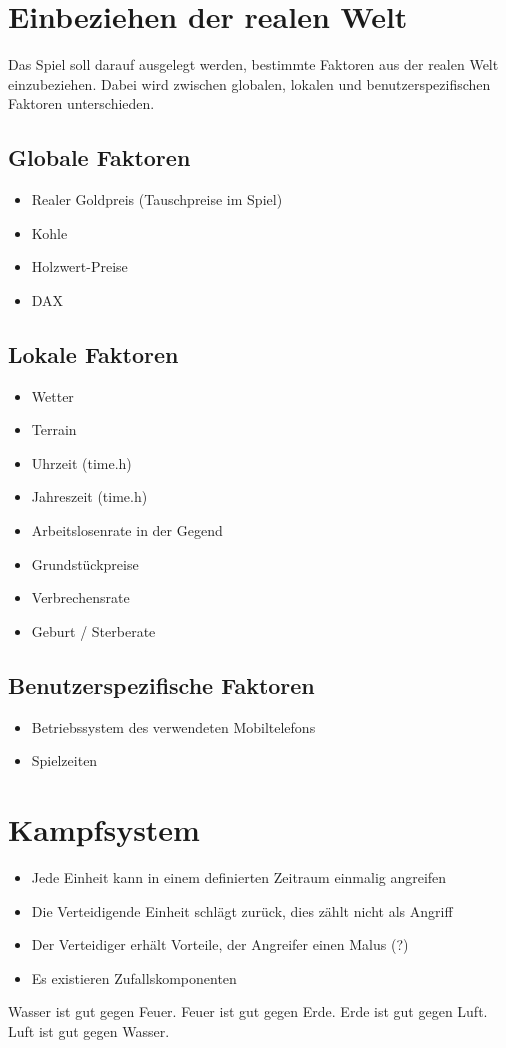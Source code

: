 \section{Einbeziehen der realen Welt}
Das Spiel soll darauf ausgelegt werden, bestimmte Faktoren aus der realen Welt einzubeziehen. Dabei wird zwischen globalen, lokalen und benutzerspezifischen Faktoren unterschieden. 

\subsection{Globale Faktoren}
\begin{itemize}
\item Realer Goldpreis (Tauschpreise im Spiel)
\item Kohle
\item Holzwert-Preise
\item DAX
\end{itemize}

\subsection{Lokale Faktoren}
\begin{itemize}
\item Wetter 
\item Terrain 
\item Uhrzeit (time.h)
\item Jahreszeit (time.h)
\item Arbeitslosenrate in der Gegend
\item Grundstückpreise
\item Verbrechensrate
\item Geburt / Sterberate
\end{itemize}

\subsection{Benutzerspezifische Faktoren}
\begin{itemize}
\item Betriebssystem des verwendeten Mobiltelefons
\item Spielzeiten
\end{itemize}


\section{Kampfsystem}
\begin{itemize}
\item Jede Einheit kann in einem definierten Zeitraum einmalig angreifen
\item Die Verteidigende Einheit schlägt zurück, dies zählt nicht als Angriff
\item Der Verteidiger erhält Vorteile, der Angreifer einen Malus (?)
\item Es existieren Zufallskomponenten
\end{itemize}


Wasser ist gut gegen Feuer. Feuer ist gut gegen Erde. Erde ist gut gegen Luft. Luft ist gut gegen Wasser. 

